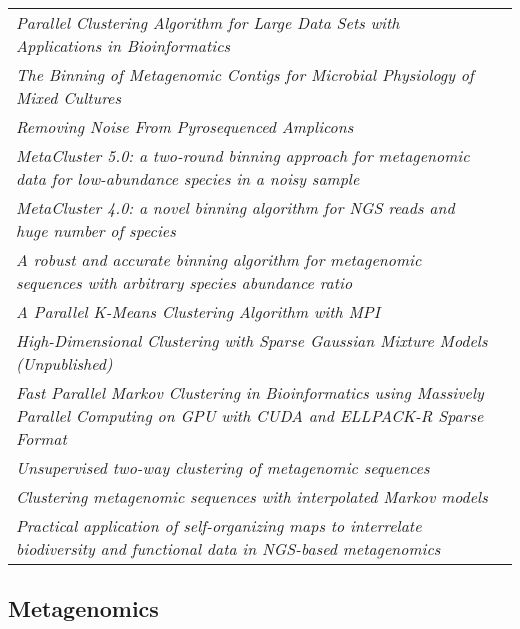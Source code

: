 \documentclass{article}
\begin{document}
\begin{tabularx}{\linewidth}{>{\itshape}X |p{5cm}}
Parallel Clustering Algorithm for Large Data Sets with Applications in Bioinformatics & \cite{Olman2009} \\

The Binning of Metagenomic Contigs for Microbial Physiology of Mixed Cultures & \cite{Strous2012}\\

Removing Noise From Pyrosequenced Amplicons & \cite{Quince2011}\\

MetaCluster 5.0: a two-round binning approach for metagenomic data for low-abundance species in a noisy sample & \cite{Wang2012_5}\\

MetaCluster 4.0: a novel binning algorithm for NGS reads and huge number of species & \cite{Wang2012_4}\\

A robust and accurate binning algorithm for metagenomic sequences with arbitrary species abundance ratio & \cite{Leung2011}\\

A Parallel K-Means Clustering Algorithm with MPI & \cite{Zhang2011}\\

High-Dimensional Clustering with Sparse Gaussian Mixture Models (Unpublished) & \cite{Krishnamurthya}\\

Fast Parallel Markov Clustering in Bioinformatics using Massively Parallel Computing on GPU with CUDA and ELLPACK-R Sparse Format & \cite{Bustamam2011} \\

Unsupervised two-way clustering of metagenomic sequences & \cite{Prabhakara2012}\\

Clustering metagenomic sequences with interpolated Markov models & \cite{Kelley2010}\\

Practical application of self-organizing maps to interrelate biodiversity and functional data in NGS-based metagenomics & \cite{Weber2011}\\


\end{tabularx}

\subsection*{Metagenomics}
\end{document}
